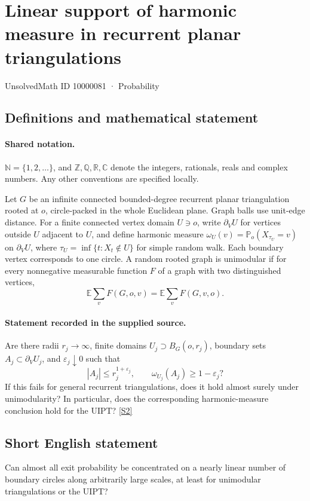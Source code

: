 \documentclass[11pt]{article}
\newcommand{\sref}[2]{\hyperlink{source:#1:#2}{[S#2]}}
\begin{document}
\setcounter{section}{10000080}
\section{Linear support of harmonic measure in recurrent planar triangulations}\label{10000081}
{\small\sffamily UnsolvedMath ID 10000081 · Probability}
\subsection{Definitions and mathematical statement}

\paragraph{Shared notation.}$\mathbb N=\{1,2,\ldots\}$, and $\mathbb Z,\mathbb Q,\mathbb R,\mathbb C$ denote the integers, rationals, reals and complex numbers. Any other conventions are specified locally.


Let $G$ be an infinite connected bounded-degree recurrent planar triangulation rooted at $o$, circle-packed in the whole Euclidean plane. Graph balls use unit-edge distance. For a finite connected vertex domain $U\ni o$, write $\partial_VU$ for vertices outside $U$ adjacent to $U$, and define harmonic measure $\omega_U(v)=\mathbb P_o(X_{\tau_U}=v)$ on $\partial_VU$, where $\tau_U=\inf\{t:X_t\notin U\}$ for simple random walk. Each boundary vertex corresponds to one circle. A random rooted graph is unimodular if for every nonnegative measurable function $F$ of a graph with two distinguished vertices,
\[\mathbb E\sum_vF(G,o,v)=\mathbb E\sum_vF(G,v,o).\]
\paragraph{Statement recorded in the supplied source.}
Are there radii $r_j\to\infty$, finite domains $U_j\supset B_G(o,r_j)$, boundary sets $A_j\subset\partial_VU_j$, and $\varepsilon_j\downarrow0$ such that
\[|A_j|\le r_j^{1+\varepsilon_j},\qquad\omega_{U_j}(A_j)\ge1-\varepsilon_j?\]
If this fails for general recurrent triangulations, does it hold almost surely under unimodularity? In particular, does the corresponding harmonic-measure conclusion hold for the UIPT? \sref{10000081}{2}
\subsection{Short English statement}
Can almost all exit probability be concentrated on a nearly linear number of boundary circles along arbitrarily large scales, at least for unimodular triangulations or the UIPT?
\end{document}
